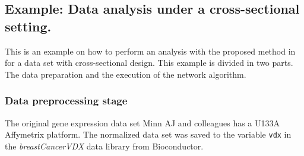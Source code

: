 \documentclass[12pt]{article}
\newcommand{\Robject}[1]{{\texttt{#1}}}
\newcommand{\Rpackage}[1]{\textit{#1}}
\begin{document}
\subsection{Example: Data analysis under a cross-sectional setting.}
This is an example on how to perform an analysis with the proposed method in \cite{Quiroz2013} for a data set with cross-sectional design. This example is divided in two parts. The data preparation and the execution of the network algorithm.
\subsubsection{Data preprocessing stage}
The original gene expression data set Minn AJ and colleagues \cite{Minn2007} has a U133A Affymetrix platform. The normalized data set was saved to the variable \Robject{vdx} in the \Rpackage{breastCancerVDX} data library from Bioconductor. 
\footnotesize
\end{document}

